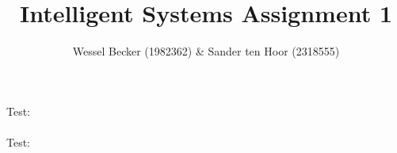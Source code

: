 \documentclass[10pt,a4paper]{article}
\begin{document}
\title{Intelligent Systems Assignment 1}
\author{Wessel Becker (1982362) \& Sander ten Hoor (2318555)}
\maketitle
Test: \\\\


Test: \\\\

\end{document}

